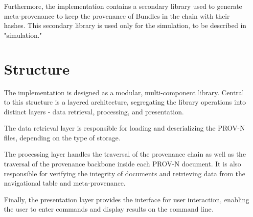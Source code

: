 \documentclass[
  digital,     %
  oneside,     %
  nosansbold,  %
  nocolorbold, %
  lof,         %
  lot,         %
]{fithesis4}
\begin{document}
Furthermore, the implementation contains a secondary library used to generate meta-provenance to keep the provenance of Bundles in the chain with their hashes. This secondary library is used only for the simulation, to be described in "simulation."

\section{Structure}
\shorthandoff{-}
The implementation is designed as a modular, multi-component library. Central to this structure is a layered architecture, segregating the library operations into distinct layers - data retrieval, processing, and presentation. 

The data retrieval layer is responsible for loading and deserializing the PROV-N files, depending on the type of storage. 

The processing layer handles the traversal of the provenance chain as well as the traversal of the provenance backbone inside each PROV-N document. It is also responsible for verifying the integrity of documents and retrieving data from the navigational table and meta-provenance.

Finally, the presentation layer provides the interface for user interaction, enabling the user to enter commands and display results on the command line.
\shorthandon{-}
\end{document}
